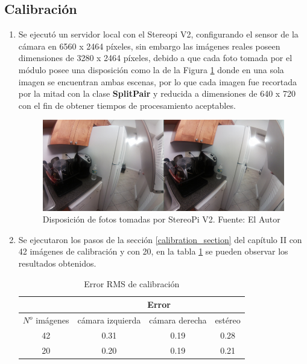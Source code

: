 \subsection{Calibración}
\begin{enumerate}
    \item Se ejecutó un servidor local con el Stereopi V2, configurando el sensor de la cámara en 6560 x 2464 píxeles, sin embargo las imágenes reales poseen dimensiones de 3280 x 2464 píxeles, debido a que cada foto tomada por el módulo posee una disposición como la de la Figura \ref{side-by-side} donde en una sola imagen se encuentran ambas escenas, por lo que cada imagen fue recortada por la mitad con la clase \textbf{SplitPair} y reducida a dimensiones de 640 x 720 con el fin de obtener tiempos de procesamiento aceptables.
    \begin{figure}[H]
    \centering
    \includegraphics[scale=0.5]{Recursos/side_by_side.png}
    \caption[Disposición de fotos tomadas por StereoPi V2.]{Disposición de fotos tomadas por StereoPi V2. {\footnotesize Fuente: El Autor}}
    \label{side-by-side}
    \end{figure}
    \item Se ejecutaron los pasos de la sección \ref{calibration_section} del capítulo II con 42 imágenes de calibración y con 20, en la tabla \ref{calibration_results} se pueden observar los resultados obtenidos.
    \begin{table}[H]
    \centering
    \caption{Error RMS de calibración}
    \label{calibration_results}
    \begin{tabular}{c|ccc|}
    \cline{2-4}
    \multicolumn{1}{l|}{}                & \multicolumn{3}{c|}{Error}                                                            \\ \hline
    \multicolumn{1}{|c|}{$N^o$ imágenes} & \multicolumn{1}{c|}{cámara izquierda} & \multicolumn{1}{c|}{cámara derecha} & estéreo \\ \hline
    \multicolumn{1}{|c|}{42}             & \multicolumn{1}{c|}{0.31}             & \multicolumn{1}{c|}{0.19}           & 0.28    \\ \hline
    \multicolumn{1}{|c|}{20}             & \multicolumn{1}{c|}{0.20}             & \multicolumn{1}{c|}{0.19}           & 0.21    \\ \hline
    \end{tabular}
    \end{table}
\end{enumerate}
